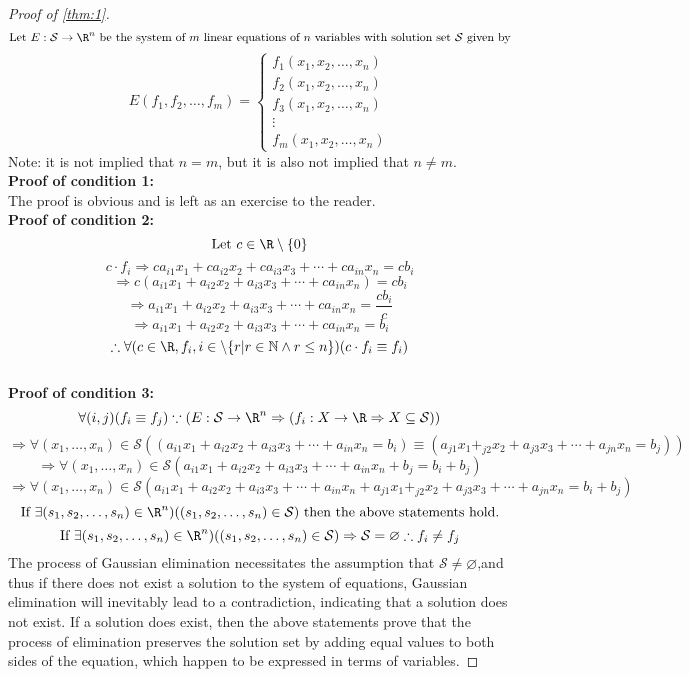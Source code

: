 \begin{proof}[Proof of \ref{thm:1}]\label{proof:1}
	$$\text{Let }E:\mathcal{S}\rightarrow\R^n\text{ be the system of }m\text{ linear equations of }n\text{ variables with solution set }\mathcal{S}\text{ given by}$$
	$$E(f_1,f_2,\ldots,f_m)=\left\{
	\begin{array}{c}
		f_1(x_1,x_2,\ldots,x_n)\\
		f_2(x_1,x_2,\ldots,x_n)\\
		f_3(x_1,x_2,\ldots,x_n)\\
		\vdots\\
		f_m(x_1,x_2,\ldots,x_n)
	\end{array}
	\right.$$
	Note: it is not implied that $n=m$, but it is also not implied that $n\neq m$.\vspace{5mm}\\
	\textbf{Proof of condition 1:}\\
	The proof is obvious and is left as an exercise to the reader.\vspace{5mm}\\
	\textbf{Proof of condition 2:}
	\[\text{Let }c\in\R\setminus\{0\}\]
	\[c\cdot f_i\Rightarrow ca_{i1}x_{1}+ca_{i2}x_{2}+ca_{i3}x_{3}+\cdots+ca_{in}x_{n}=cb_{i}\]
	\[\Rightarrow c(a_{i1}x_{1}+a_{i2}x_{2}+a_{i3}x_{3}+\cdots+ca_{in}x_{n})=cb_i\]
	\[\Rightarrow a_{i1}x_{1}+a_{i2}x_{2}+a_{i3}x_{3}+\cdots+ca_{in}x_{n}=\frac{cb_i}{c}\]
	\[\Rightarrow a_{i1}x_{1}+a_{i2}x_{2}+a_{i3}x_{3}+\cdots+ca_{in}x_{n}=b_i\]
	\[\therefore\forall(c\in\R,f_i,i\in\setminus\{r|r\in\mathbb{N}\land r\leq n\})(c\cdot f_i\equiv f_i)\]\vspace{5mm}\\
	\textbf{Proof of condition 3:}
	\[\forall(i,j)(f_i\equiv f_j)\because(E:\mathcal{S}\rightarrow\R^n\Rightarrow(f_i:X\rightarrow\R\Rightarrow X\subseteq\mathcal{S}))\]
	\[\Rightarrow\forall(x_1,\ldots,x_n)\in\mathcal{S}((a_{i1}x_{1}+a_{i2}x_2+a_{i3}x_3+\cdots+a_{in}x_n=b_i)\equiv(a_{j1}x_1+_{j2}x_2+a_{j3}x_3+\cdots+a_{jn}x_n=b_j))\]
	\[\Rightarrow\forall(x_1,\ldots,x_n)\in\mathcal{S}(a_{i1}x_{1}+a_{i2}x_2+a_{i3}x_3+\cdots+a_{in}x_n +b_j = b_i + b_j)\]
	\[\Rightarrow\forall(x_1,\ldots,x_n)\in\mathcal{S}(a_{i1}x_{1}+a_{i2}x_2+a_{i3}x_3+\cdots+a_{in}x_n+a_{j1}x_1+_{j2}x_2+a_{j3}x_3+\cdots+a_{jn}x_n=b_i + b_j)\]
	\[\text{If }\exists(s_1,s_2,\ldots,s_n)\in\R^n)((s_1,s_2,\ldots,s_n)\in\mathcal{S})\text{ then the above statements hold.}\]
	\[\text{If }\exists(s_1,s_2,\ldots,s_n)\in\R^n)((s_1,s_2,\ldots,s_n)\in\mathcal{S})\Rightarrow\mathcal{S}=\varnothing\therefore f_i\neq f_j\]
	The process of Gaussian elimination necessitates the assumption that $\mathcal{S}\neq\varnothing$,and thus if there does not exist a solution to the system of equations, Gaussian elimination will inevitably lead to a contradiction, indicating that a solution does not exist. If a solution does exist, then the above statements prove that the process of elimination preserves the solution set by adding equal values to both sides of the equation, which happen to be expressed in terms of variables.
\end{proof}
